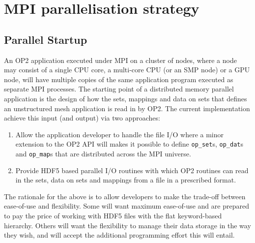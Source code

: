 \documentclass[11pt]{article}
\begin{document}
\section{MPI parallelisation strategy}
\subsection{Parallel Startup}\label{subsec/startup}
An OP2 application executed under MPI on a cluster of nodes, where a node may
consist of a single CPU core, a multi-core CPU (or an SMP node) or a GPU node,
will have multiple copies of the same application program executed as separate
MPI processes. The starting point of a distributed memory parallel application
is the design of how the sets, mappings and data on sets that defines an
unstructured mesh application is read in by OP2. The current implementation
achieve this input (and output) via two approaches:
\begin{enumerate}
\item Allow the application developer to handle the file I/O where a minor
extension to the OP2 API will makes it possible to define \texttt{op\_set}s,
\texttt{op\_dat}s and \texttt{op\_map}s that are distributed across the MPI
universe.
\item Provide HDF5 based parallel I/O routines with which OP2 routines can
read in the sets, data on sets and mappings from a file in a prescribed format.
\end{enumerate}
The rationale for the above is to allow developers to make the trade-off between
ease-of-use and flexibility. Some will want maximum ease-of-use and are prepared
to pay the price of working with HDF5 files with the flat keyword-based
hierarchy. Others will want the flexibility to manage their data storage in
the way they wish, and will accept the additional programming effort this will entail.
\end{document}
